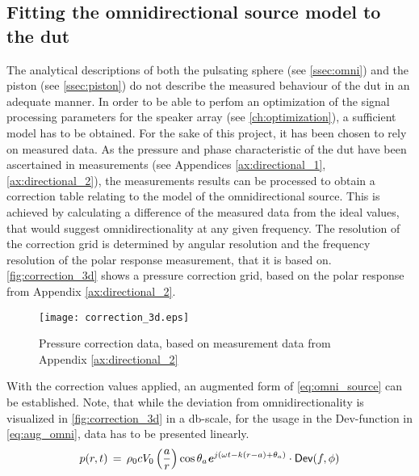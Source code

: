 \subsection{Fitting the omnidirectional source model to the \gls{dut}}\label{sec:correction}
The analytical descriptions of both the pulsating sphere (see \autoref{ssec:omni}) and the piston (see \autoref{ssec:piston}) do not describe the measured behaviour of the \gls{dut} in an adequate manner. In order to be able to perfom an optimization of the signal processing parameters for the speaker array (see \autoref{ch:optimization}), a sufficient model has to be obtained. For the sake of this project, it has been chosen to rely on measured data.
As the pressure and phase characteristic of the \gls{dut} have been ascertained in measurements (see Appendices \ref{ax:directional_1},\ref{ax:directional_2}), the measurements results can be processed to obtain a correction table relating to the model of the omnidirectional source. This is achieved by calculating a difference of the measured data from the ideal values, that would suggest omnidirectionality at any given frequency. The resolution of the correction grid is determined by angular resolution and the frequency resolution of the polar response measurement, that it is based on.  \autoref{fig:correction_3d} shows a pressure correction grid, based on the polar response from Appendix \ref{ax:directional_2}.
\begin{figure}[H]
	\centering
	\texttt{[image: correction\_3d.eps]}
	\caption{Pressure correction data, based on measurement data from Appendix \ref{ax:directional_2}}
		\label{fig:correction_3d}
\end{figure}
With the correction values applied, an augmented form of \autoref{eq:omni_source} can be established. Note, that while the deviation from omnidirectionality is visualized in \autoref{fig:correction_3d} in a \si{\decibel}-scale, for the usage in the \textsf{Dev}-function in \autoref{eq:aug_omni}, data has to be presented linearly.
\begin{equation}\label{eq:aug_omni}
p(r,t)\,=\,\rho_0 c V_0 \left(\frac{a}{r}\right)\cos \theta_a \textbf{\textit{e}}^{j\left(\omega t - k(r-a)+\theta_a\right)}\cdot\textsf{Dev}(f,\phi)
\end{equation}
\startexplain
{}
\stopexplain
